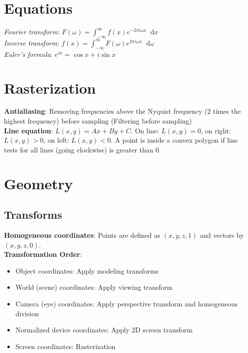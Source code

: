 \documentclass[10pt,landscape]{article}
\newcommand*\diff{\mathop{}\!\mathrm{d}}
\begin{document}
\raggedright
\footnotesize
\begin{multicols}{3}

\setlength{\premulticols}{1pt}
\setlength{\postmulticols}{1pt}
\setlength{\multicolsep}{1pt}
\setlength{\columnsep}{2pt}


\section{Equations}

\textit{Fourier transform}: $F(\omega) = \int_{-\infty}^{\infty} f(x) e^{-2\pi i \omega x} \diff x$ \\
\textit{Inverse transform}: $f(x) = \int_{-\infty}^{\infty} F(\omega) e^{2\pi i \omega x} \diff\omega$ \\
\textit{Euler's formula}: $e^{ix} = \cos x + i\sin x$


\section{Rasterization}

\textbf{Antialiasing}: Removing frequencies above the Nyquist frequency (2 times the highest frequency) before sampling (Filtering before sampling) \\
\textbf{Line equation}: $L(x, y) = Ax + By + C$. On line: $L(x, y) = 0$, on right: $L(x, y) > 0$, on left: $L(x, y) < 0$. A point is inside a convex polygon if line tests for all lines (going clockwise) is greater than 0.


\section{Geometry}

\subsection{Transforms}

\textbf{Homogeneous coordinates}: Points are defined as $(x, y, z, 1)$ and vectors by $(x, y, z, 0)$. \\

\textbf{Transformation Order}:
\begin{itemize}[nosep]
    \item Object coordinates: Apply modeling transforms
    \item World (scene) coordinates: Apply viewing transform
    \item Camera (eye) coordinates: Apply perspective transform and homogeneous division
    \item Normalized device coordinates: Apply 2D screen transform
    \item Screen coordinates: Rasterization
\end{itemize}


\end{multicols}
\end{document}
